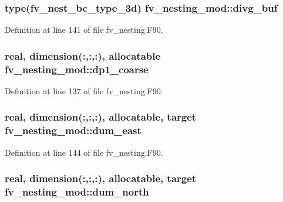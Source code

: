 \subsubsection[{divg\-\_\-buf}]{\setlength{\rightskip}{0pt plus 5cm}type(fv\-\_\-nest\-\_\-bc\-\_\-type\-\_\-3d) fv\-\_\-nesting\-\_\-mod\-::divg\-\_\-buf}\label{classfv__nesting__mod_a69d8bb3285146bc62f53d8e4ea1a41a3}


Definition at line 141 of file fv\-\_\-nesting.\-F90.

\subsubsection[{dp1\-\_\-coarse}]{\setlength{\rightskip}{0pt plus 5cm}real, dimension(\-:,\-:,\-:), allocatable fv\-\_\-nesting\-\_\-mod\-::dp1\-\_\-coarse}\label{classfv__nesting__mod_a784b3cab4ca871ca0f9cb4935c3195bc}


Definition at line 137 of file fv\-\_\-nesting.\-F90.

\subsubsection[{dum\-\_\-east}]{\setlength{\rightskip}{0pt plus 5cm}real, dimension(\-:,\-:,\-:), allocatable, target fv\-\_\-nesting\-\_\-mod\-::dum\-\_\-east}\label{classfv__nesting__mod_ac0091b561b404cccf4fe21b7ceb23056}


Definition at line 144 of file fv\-\_\-nesting.\-F90.

\subsubsection[{dum\-\_\-north}]{\setlength{\rightskip}{0pt plus 5cm}real, dimension(\-:,\-:,\-:), allocatable, target fv\-\_\-nesting\-\_\-mod\-::dum\-\_\-north}\label{classfv__nesting__mod_af3594b28f181611d0f7a3c884981f724}



